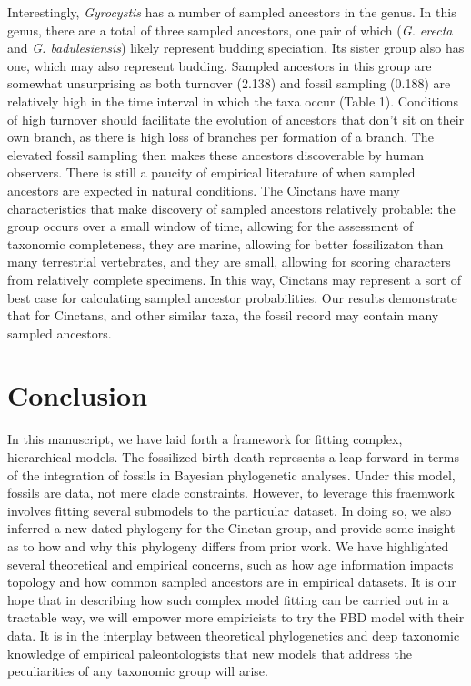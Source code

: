\documentclass{article}
\begin{document}
Interestingly, \textit{Gyrocystis} has a number of sampled ancestors in the genus. In this genus, there are a total of three sampled ancestors, one pair of which (\textit{G. erecta} and \textit{G. badulesiensis}) likely represent budding speciation.
Its sister group also has one, which may also represent budding.
Sampled ancestors in this group are somewhat unsurprising as both turnover (2.138) and fossil sampling (0.188) are relatively high in the time interval in which the taxa occur (Table 1). 
Conditions of high turnover should facilitate the evolution of ancestors that don't sit on their own branch, as there is high loss of branches per formation of a branch.
The elevated fossil sampling then makes these ancestors discoverable by human observers. 
There is still a paucity of empirical literature of when sampled ancestors are expected in natural conditions.
The Cinctans have many characteristics that make discovery of sampled ancestors relatively probable: the group occurs over a small window of time, allowing for the assessment of taxonomic completeness, they are marine, allowing for better fossilizaton than many terrestrial vertebrates, and they are small, allowing for scoring characters from relatively complete specimens.
In this way, Cinctans may represent a sort of best case for calculating sampled ancestor probabilities.
Our results demonstrate that for Cinctans, and other similar taxa, the fossil record may contain many sampled ancestors.

\section{Conclusion}

In this manuscript, we have laid forth a framework for fitting complex, hierarchical models. 
The fossilized birth-death represents a leap forward in terms of the integration of fossils in Bayesian phylogenetic analyses. 
Under this model, fossils are data, not mere clade constraints.
However, to leverage this fraemwork involves fitting several submodels to the particular dataset.
In doing so, we also inferred a new dated phylogeny for the Cinctan group, and provide some insight as to how and why this phylogeny differs from prior work.
We have highlighted several theoretical and empirical concerns, such as how age information impacts topology and how common sampled ancestors are in empirical datasets.
It is our hope that in describing how such complex model fitting can be carried out in a tractable way, we will empower more empiricists to try the FBD model with their data.
It is in the interplay between theoretical phylogenetics and deep taxonomic knowledge of empirical paleontologists that new models that address the peculiarities of any taxonomic group will arise.





 

\end{document}
